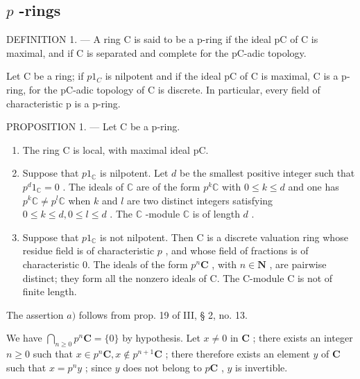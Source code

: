 \subsection{\texorpdfstring{\(p\) -rings}{p-rings}}

DEFINITION 1. --- A ring C is said to be a p-ring if the ideal pC of C is maximal, and if C is separated and complete for the pC-adic topology.

Let C be a ring; if \(p1_{C}\) is nilpotent and if the ideal pC of C is maximal, C is a p-ring, for the pC-adic topology of C is discrete. In particular, every field of characteristic p is a p-ring.

PROPOSITION 1. --- Let C be a p-ring.

\begin{enumerate}
\def\labelenumi{\alph{enumi})}
\item
  The ring C is local, with maximal ideal pC.
\item
  Suppose that \(p1_{\mathbb{C}}\) is nilpotent. Let \(d\) be the smallest positive integer such that \(p^{d}1_{\mathbb{C}} = 0\) . The ideals of \(\mathbb{C}\) are of the form \(p^{k}\mathbb{C}\) with \(0 \leqslant k \leqslant d\) and one has \(p^{k}\mathbb{C} \neq p^{l}\mathbb{C}\) when \(k\) and \(l\) are two distinct integers satisfying \(0 \leqslant k \leqslant d, 0 \leqslant l \leqslant d\) . The \(\mathbb{C}\) -module \(\mathbb{C}\) is of length \(d\) .
\item
  Suppose that \(p1_{\mathbb{C}}\) is not nilpotent. Then C is a discrete valuation ring whose residue field is of characteristic \(p\) , and whose field of fractions is of characteristic 0. The ideals of the form \(p^{n}\mathbf{C}\) , with \(n \in \mathbf{N}\) , are pairwise distinct; they form all the nonzero ideals of C. The C-module C is not of finite length.
\end{enumerate}

The assertion \(a)\) follows from prop. 19 of III, § 2, no. 13.

We have \(\bigcap_{n\geqslant 0}p^{n}\mathbf{C} = \{0\}\) by hypothesis. Let \(x\neq 0\) in \(\mathbf{C}\) ; there exists an integer \(n\geqslant 0\) such that \(x\in p^n\mathbf{C}, x\notin p^{n + 1}\mathbf{C}\) ; there therefore exists an element \(y\) of \(\mathbf{C}\) such that \(x = p^n y\) ; since \(y\) does not belong to \(p\mathbf{C}\) , \(y\) is invertible.

